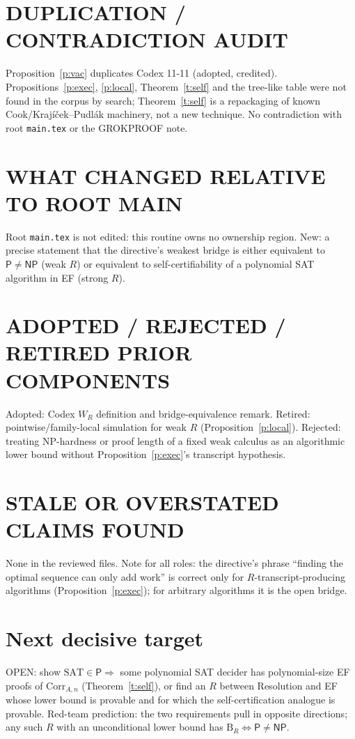 \documentclass[11pt]{article}
\newcommand{\SAT}{\mathrm{SAT}}
\newcommand{\Pc}{\mathsf P}
\newcommand{\NP}{\mathsf{NP}}
\begin{document}
\section*{DUPLICATION / CONTRADICTION AUDIT}
Proposition~\ref{p:vac} duplicates Codex 11-11 (adopted, credited).
Propositions~\ref{p:exec}, \ref{p:local}, Theorem~\ref{t:self} and the
tree-like table were not found in the corpus by search; Theorem~\ref{t:self}
is a repackaging of known Cook/Krajíček--Pudlák machinery, not a new
technique. No contradiction with root \texttt{main.tex} or the GROKPROOF note.

\section*{WHAT CHANGED RELATIVE TO ROOT MAIN}
Root \texttt{main.tex} is not edited: this routine owns no ownership region.
New: a precise statement that the directive's weakest bridge is either
equivalent to $\Pc\ne\NP$ (weak $R$) or equivalent to self-certifiability of a
polynomial SAT algorithm in EF (strong $R$).

\section*{ADOPTED / REJECTED / RETIRED PRIOR COMPONENTS}
Adopted: Codex $W_R$ definition and bridge-equivalence remark.
Retired: pointwise/family-local simulation for weak $R$
(Proposition~\ref{p:local}).
Rejected: treating NP-hardness or proof length of a fixed weak calculus as an
algorithmic lower bound without Proposition~\ref{p:exec}'s transcript
hypothesis.

\section*{STALE OR OVERSTATED CLAIMS FOUND}
None in the reviewed files. Note for all roles: the directive's phrase
``finding the optimal sequence can only add work'' is correct only for
$R$-transcript-producing algorithms (Proposition~\ref{p:exec}); for arbitrary
algorithms it is the open bridge.

\section*{Next decisive target}
OPEN: show $\SAT\in\Pc\Rightarrow$ some polynomial SAT decider has
polynomial-size EF proofs of $\mathrm{Corr}_{A,n}$ (Theorem~\ref{t:self}), or
find an $R$ between Resolution and EF whose lower bound is provable and for
which the self-certification analogue is provable. Red-team prediction: the
two requirements pull in opposite directions; any such $R$ with an
unconditional lower bound has $\mathrm B_R\Leftrightarrow\Pc\ne\NP$.
\end{document}
